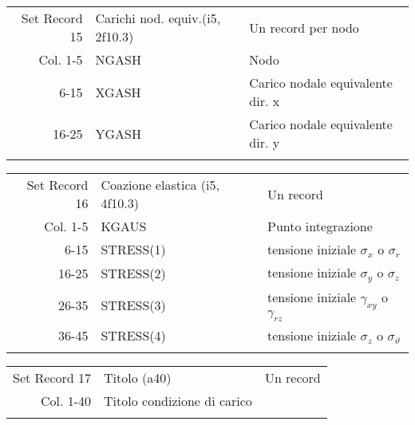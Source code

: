 \begin{tabular}{rll}
	Set Record 15& Carichi nod. equiv.(i5, 2f10.3)& Un record per nodo                                \\
	Col.  1-5    & NGASH                          & Nodo                                              \\
	6-15    & XGASH                          & Carico nodale equivalente dir. x                  \\
	16-25    & YGASH                          & Carico nodale equivalente dir. y                  \\
	&                                &                                                   \\
\end{tabular}

\begin{tabular}{rll}
	Set Record 16& Coazione elastica (i5, 4f10.3) & Un record                                         \\
	Col.  1-5    & KGAUS                          & Punto integrazione                                \\
	6-15    & STRESS(1)                      & tensione iniziale $\sigma_x$ o $\sigma_r$         \\
	16-25    & STRESS(2)                      & tensione iniziale $\sigma_y$ o $\sigma_z$         \\
	26-35    & STRESS(3)                      & tensione iniziale $\gamma_{xy}$ o $\gamma_{rz}$   \\
	36-45    & STRESS(4)                      & tensione iniziale $\sigma_z$ o $\sigma_\vartheta$ \\
	&                                &                                                   \\
\end{tabular}

\begin{tabular}{rll}
	Set Record 17& Titolo (a40)                   & Un record                                         \\
	Col. 1-40    & Titolo condizione di carico    &                                                   \\
	&                                &                                                   \\
\end{tabular}

